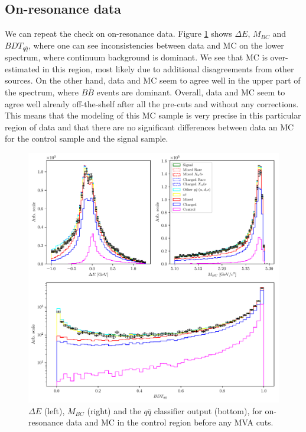 \subsection{On-resonance data}

We can repeat the check on on-resonance data. Figure \ref{fig:onres_control} shows $\Delta E$, $M_{BC}$ and $BDT_{q \bar q}$, where one can see inconsistencies between data and MC on the lower spectrum, where continuum background is dominant. We see that MC is over-estimated in this region, most likely due to additional disagreements from other sources. On the other hand, data and MC seem to agree well in the upper part of the spectrum, where $B \bar B$ events are dominant. Overall, data and MC seem to agree well already off-the-shelf after all the pre-cuts and without any corrections. This means that the modeling of this MC sample is very precise in this particular region of data and that there are no significant differences between data an MC for the control sample and the signal sample.
\begin{figure}[H]
\centering
\captionsetup{width=0.8\linewidth}
\includegraphics[width=\linewidth]{fig/onres_control}
\caption{$\Delta E$ (left), $M_{BC}$ (right) and the $q \bar q$ classifier output (bottom), for on-resonance data and MC in the control region before any MVA cuts.}
\label{fig:onres_control}
\end{figure}